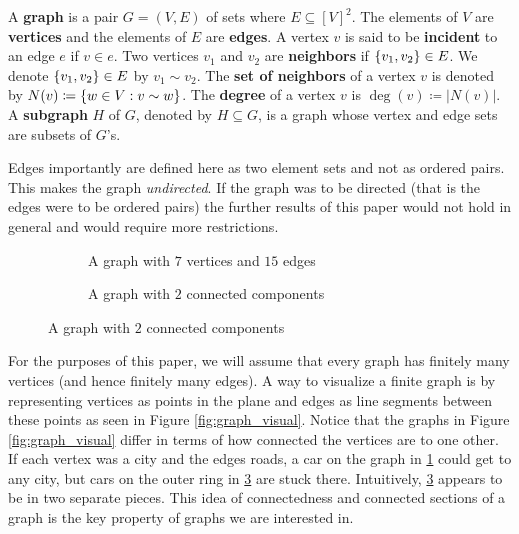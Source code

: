 \documentclass[12pt]{article}
\begin{document}
\begin{definition}
    A \textbf{graph} is a pair $G = (V, E)$ of sets where $E \subseteq [V]^2$. The elements of $V$ are \textbf{vertices} and the elements of $E$ are \textbf{edges}. A vertex $v$ is said to be \textbf{incident} to an edge $e$ if $v \in e$. Two vertices $v_1$ and $v_2$ are \textbf{neighbors} if $\qty{v_1, v_2} \in E$. We denote $\qty{v_1, v_2} \in E$ by $v_1 \sim v_2$. The \textbf{set of neighbors} of a vertex $v$ is denoted by $N(v) \coloneq \qty{w \in V : v \sim w}$. The \textbf{degree} of a vertex $v$ is $\deg(v) \coloneq |N(v)|$. A \textbf{subgraph} $H$ of $G$, denoted by $H \subseteq G$, is a graph whose vertex and edge sets are subsets of $G$'s.
\end{definition}

\begin{remark}
    Edges importantly are defined here as two element sets and not as ordered pairs. This makes the graph \textit{undirected}. If the graph was to be directed (that is the edges were to be ordered pairs) the further results of this paper would not hold in general and would require more restrictions.
\end{remark}

\begin{figure}
    \centering
    \caption{Two example graphs in the plane}
    \label{fig:graph_visual}
    \begin{subfigure}[t]{0.45\textwidth}
        \centering
        \caption{A graph with $7$ vertices and $15$ edges}
        \label{fig:basic_graph}
    \end{subfigure}\hfill
    \begin{subfigure}[t]{0.45\textwidth}
        \centering
        \caption{A graph with $2$ connected components}
        \label{fig:connected_components}
    \end{subfigure}
\end{figure}

For the purposes of this paper, we will assume that every graph has finitely many vertices (and hence finitely many edges). A way to visualize a finite graph is by representing vertices as points in the plane and edges as line segments between these points as seen in Figure \ref{fig:graph_visual}. Notice that the graphs in Figure \ref{fig:graph_visual} differ in terms of how connected the vertices are to one other. If each vertex was a city and the edges roads, a car on the graph in \ref{fig:basic_graph} could get to any city, but cars on the outer ring in \ref{fig:connected_components} are stuck there. Intuitively, \ref{fig:connected_components} appears to be in two separate pieces. This idea of connectedness and connected sections of a graph is the key property of graphs we are interested in.
\end{document}
